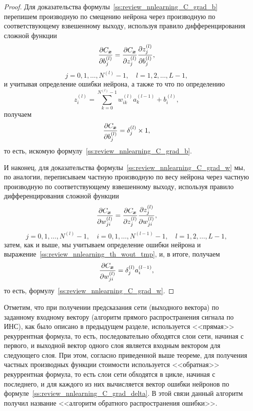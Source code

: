 \documentclass[a4paper,12pt,russian]{article} %
\begin{document}
\begin{proof}
	Для доказательства формулы~\eqref{ss:review_nnlearning_C_grad_b} перепишем производную по смещению нейрона через производную по соответствующему взвешенному выходу, используя правило дифференцирования сложной функции
	$$
		\frac{\partial C_{\bm{x}}}{\partial b_j^{(l)}} = 
			\frac{\partial C_{\bm{x}}}{\partial z_j^{(l)}}
			\frac{\partial z_j^{(l)}}{\partial b_j^{(l)}},
	$$
	$$
		j = 0, 1, \ldots, N^{(l)}-1,
		\quad
		l = 1, 2, \ldots, L-1,
	$$
	и учитывая определение ошибки нейрона, а также то что по определению
	\begin{equation} \label{ss:review_nnlearning_th_wout_tmp}
		z_i^{(l)} = \sum_{k=0}^{N^{(l)}-1} w_{ik}^{(l)} a_k^{(l-1)} + b_i^{(l)},
	\end{equation}
	получаем
	$$
		\frac{\partial C_{\bm{x}}}{\partial b_j^{(l)}} =  \delta_j^{(l)} \times 1,
	$$
	то есть, искомую формулу~\eqref{ss:review_nnlearning_C_grad_b}.

	И наконец, для доказательства формулы~\eqref{ss:review_nnlearning_C_grad_w} мы, по аналогии, переписываем частную производную по весу нейрона через частную производную по соответствующему взвешенному выходу, используя правило дифференцирования сложной функции
	$$
		\frac{\partial C_{\bm{x}}}{\partial w_{ji}^{(l)}} = 
			\frac{\partial C_{\bm{x}}}{\partial z_j^{(l)}}
			\frac{\partial z_j^{(l)}}{\partial w_{ji}^{(l)}},
	$$
	$$
		j = 0, 1, \ldots, N^{(l)}-1,
		\quad
		i = 0, 1, \ldots, N^{(l-1)}-1,
		\quad
		l = 1, 2, \ldots, L-1,
	$$
	затем, как и выше, мы учитываем определение ошибки нейрона и выражение~\eqref{ss:review_nnlearning_th_wout_tmp}, и, в итоге, получаем
	$$
		\frac{\partial C_{\bm{x}}}{\partial w_{ji}^{(l)}} =  \delta_j^{(l)} a_i^{(l-1)},
	$$
	то есть, формулу~\eqref{ss:review_nnlearning_C_grad_w}.
\end{proof}

Отметим, что при получении предсказания сети (выходного вектора) по заданному входному вектору (алгоритм прямого распространения сигнала по ИНС), как было описано в предыдущем разделе, используется <<прямая>> рекуррентная формула, то есть, последовательно обходятся слои сети, начиная с первого, и выходной вектор одного слоя является входным вектором для следующего слоя.
При этом, согласно приведенной выше теореме, для получения частных производных функции стоимости используется <<обратная>> рекуррентная формула, то есть слои сети обходятся в цикле, начиная с последнего, и для каждого из них вычисляется вектор ошибки нейронов по формуле~\eqref{ss:review_nnlearning_C_grad_delta}.
В этой связи данный алгоритм получил название <<алгоритм обратного распространения ошибки>>.
\end{document}
